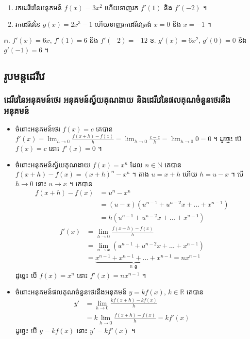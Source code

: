 \begin{pro}
\begin{enumerate}[a]
  \item រកដេរីវេនៃអនុគមន៍ $f(x) = 3x^2$ ហើយទាញរក $f'(1)$ និង $f'(-2)$ ។
  \item រកដេរីវេនៃ $g(x) = 2x^3 - 1$ ហើយទាញរកដេរីវេត្រង់ $x = 0$ និង $x = -1$ ។
\end{enumerate}
\ans
ក. $f'(x) = 6x$, $f'(1) = 6$ និង $f'(-2) = -12$ \quad ខ. $g'(x) = 6x^2$, $g'(0) = 0$ និង $g'(-1) = 6$ ។
\end{pro}

\subsection{រូបមន្តដេរីវេ}
\subsubsection{ដេរីវេនៃអនុគមន៍ថេរ អនុគមន៍ស្វ័យគុណងាយ និងដេរីវេនៃផលគុណចំនួនថេរនឹងអនុគមន៍}

\begin{itemize}
  \item ចំពោះអនុគមន៍ថេរ $f(x) = c$ គេបាន $\displaystyle f'(x) = \lim_{h \to 0}\frac{f(x + h) - f(x)}{h} = \lim_{h \to 0}\frac{c - c}{h} = \lim_{h \to 0} 0 = 0$ ។ ដូច្នេះ បើ $f(x) = c$ នោះ $f'(x) = 0$ ។
  \item ចំពោះអនុគមន៍ស្វ័យគុណងាយ $f(x) = x^n$ ដែល $n \in \mathbb{N}$ គេបាន $f(x + h) - f(x) = (x + h)^n - x^n$ ។ តាង $u = x + h$ ហើយ $h = u - x$ ។ បើ $h \to 0$ នោះ $u \to x$ ។ គេបាន
  \[ \begin{aligned}
f(x + h) - f(x) &= u^n - x^n\\
&= (u - x)(u^{n-1} + u^{n-2}x + \dots + x^{n-1})\\
&= h(u^{n-1} + u^{n-2}x + \dots + x^{n-1})
\end{aligned} \]
  \[ \begin{aligned}
f'(x) &= \lim_{h \to 0}\frac{f(x + h) - f(x)}{h}\\
&= \lim_{u \to x}(u^{n-1} + u^{n-2}x + \dots + x^{n-1})\\
&= \underbrace{x^{n-1} + x^{n-1} + \dots + x^{n-1}}_{n \text{ តួ}} = nx^{n-1}
\end{aligned} \]
  ដូច្នេះ បើ $f(x) = x^n$ នោះ $f'(x) = nx^{n-1}$ ។
  \item ចំពោះអនុគមន៍ផលគុណចំនួនថេរនឹងអនុគមន៍ $y = kf(x)$, $k \in \mathbb{R}$ គេបាន
  \[
\begin{aligned}
y' &= \lim_{h \to 0}\frac{kf(x + h) - kf(x)}{h}\\
&= k\lim_{h \to 0}\frac{f(x + h) - f(x)}{h} = kf'(x)
\end{aligned}
\]
  ដូច្នេះ បើ $y = kf(x)$ នោះ $y' = kf'(x)$ ។
\end{itemize}

